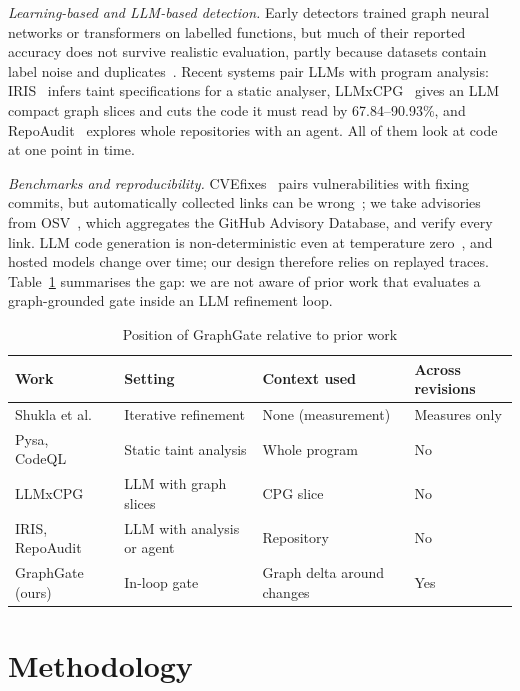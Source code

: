 \documentclass[conference]{IEEEtran}
\begin{document}
\textit{Learning-based and LLM-based detection.} Early detectors trained graph neural networks or transformers on labelled functions, but much of their reported accuracy does not survive realistic evaluation, partly because datasets contain label noise and duplicates~\cite{ding2025primevul}. Recent systems pair LLMs with program analysis: IRIS~\cite{li2025iris} infers taint specifications for a static analyser, LLMxCPG~\cite{lekssays2025llmxcpg} gives an LLM compact graph slices and cuts the code it must read by 67.84--90.93\%, and RepoAudit~\cite{guo2025repoaudit} explores whole repositories with an agent. All of them look at code at one point in time.

\textit{Benchmarks and reproducibility.} CVEfixes~\cite{bhandari2021cvefixes} pairs vulnerabilities with fixing commits, but automatically collected links can be wrong~\cite{ding2025primevul}; we take advisories from OSV~\cite{osv}, which aggregates the GitHub Advisory Database, and verify every link. LLM code generation is non-deterministic even at temperature zero~\cite{ouyang2025nondeterminism}, and hosted models change over time; our design therefore relies on replayed traces. Table~\ref{tab:related} summarises the gap: we are not aware of prior work that evaluates a graph-grounded gate inside an LLM refinement loop.

\begin{table}[t]
\caption{Position of GraphGate relative to prior work}
\label{tab:related}
\centering
\footnotesize
\begin{tabular}{|p{1.9cm}|p{1.8cm}|p{1.7cm}|p{1.2cm}|}
\hline
\textbf{Work} & \textbf{Setting} & \textbf{Context used} & \textbf{Across revisions} \\
\hline
Shukla et al.~\cite{shukla2025degradation} & Iterative refinement & None (measurement) & Measures only \\
\hline
Pysa, CodeQL~\cite{pysa,codeql} & Static taint analysis & Whole program & No \\
\hline
LLMxCPG~\cite{lekssays2025llmxcpg} & LLM with graph slices & CPG slice & No \\
\hline
IRIS, RepoAudit~\cite{li2025iris,guo2025repoaudit} & LLM with analysis or agent & Repository & No \\
\hline
GraphGate (ours) & In-loop gate & Graph delta around changes & Yes \\
\hline
\end{tabular}
\end{table}

\section{Methodology}
\label{sec:method}
\end{document}
